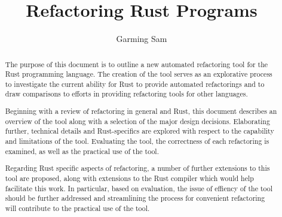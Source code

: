 \documentclass[11pt
              , a4paper
              , openright
              ]{report}
\title{Refactoring Rust Programs}
\author{Garming Sam}
\date{}
\begin{document}
\frontmatter



\begin{abstract}

The purpose of this document is to outline a new automated refactoring tool for the Rust programming language. The creation of the tool serves as an explorative process to investigate the current ability for Rust to provide automated refactorings and to draw comparisons to  efforts in providing refactoring tools for other languages. 

Beginning with a review of refactoring in general and Rust, this document describes an overview of the tool along with a selection of the major design decisions. Elaborating further, technical details and Rust-specifics are explored with respect to the capability and limitations of the tool. Evaluating the tool, the correctness of each refactoring is examined, as well as the practical use of the tool.

Regarding Rust specific aspects of refactoring, a number of further extensions to this tool are proposed, along with extensions to the Rust compiler which would help facilitate this work. In particular, based on evaluation, the issue of effiency of the tool should be further addressed and streamlining the process for convenient refactoring will contribute to the practical use of the tool.



\end{abstract}
\end{document}
